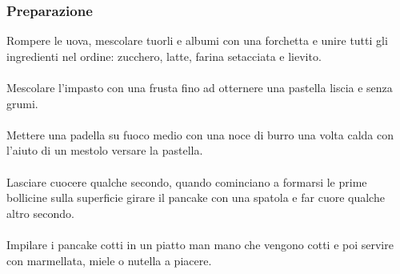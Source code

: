 \documentclass[12pt, a4paper]{article}
\begin{document}
\subsubsection{Preparazione}
	Rompere le uova, mescolare tuorli e albumi con una forchetta e unire
	tutti gli ingredienti nel ordine: zucchero, latte, farina setacciata 
	e lievito.\\\\
	Mescolare l'impasto con una frusta fino ad otternere una pastella
	liscia e senza grumi.\\\\
	Mettere una padella su fuoco medio con una noce di burro una volta
	calda con l'aiuto di un mestolo versare la pastella.\\\\
	Lasciare cuocere qualche secondo, quando cominciano a formarsi 
	le prime bollicine sulla superficie girare il pancake con una spatola
	e far cuore qualche altro secondo.\\\\
	Impilare i pancake cotti in un piatto man mano che vengono cotti e poi
	servire con marmellata, miele o nutella a piacere.
\clearpage


\clearpage
\end{document}
